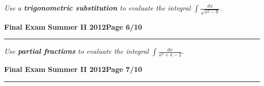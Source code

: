 \documentclass[12pt]{article}
\begin{document}
{\bigskip
{\problem[10 pts] \em Use a \textbf{trigonometric substitution} to evaluate the integral $\displaystyle{\int \frac{dx}{\sqrt{x^2-9}}}$.}
\vspace{18cm}
\begin{flushright}
\end{flushright}
\newpage

\hfill{\large\bf Final Exam}\hfill{\large\bf
  Summer II 2012}\hfill{\large\bf Page 6/10}\hrule
  
\bigskip
{\problem[5 pts] \em Use \textbf{partial fractions} to evaluate the integral $\displaystyle{\int \frac{dx}{x^2+x-2}}$.}
\vspace{18cm}
\begin{flushright}
\end{flushright}

\newpage

\hfill{\large\bf Final Exam}\hfill{\large\bf
  Summer II 2012}\hfill{\large\bf Page 7/10}\hrule

}
\end{document}

